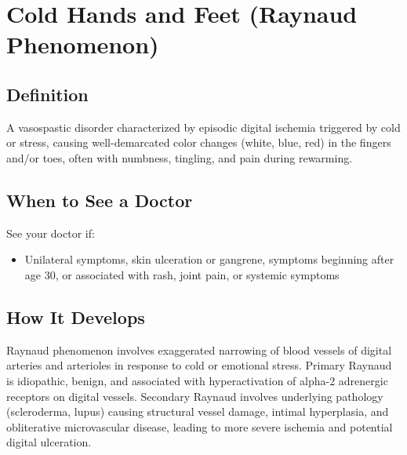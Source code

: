 \chapter{Cold Hands and Feet (Raynaud Phenomenon)}

\section*{Definition}
A vasospastic disorder characterized by episodic digital ischemia triggered by cold or stress, causing well-demarcated color changes (white, blue, red) in the fingers and/or toes, often with numbness, tingling, and pain during rewarming.

\section*{When to See a Doctor}
See your doctor if:
\begin{itemize}
  \item Unilateral symptoms, skin ulceration or gangrene, symptoms beginning after age 30, or associated with rash, joint pain, or systemic symptoms
\end{itemize}

\section*{How It Develops}
Raynaud phenomenon involves exaggerated narrowing of blood vessels of digital arteries and arterioles in response to cold or emotional stress. Primary Raynaud is idiopathic, benign, and associated with hyperactivation of alpha-2 adrenergic receptors on digital vessels. Secondary Raynaud involves underlying pathology (scleroderma, lupus) causing structural vessel damage, intimal hyperplasia, and obliterative microvascular disease, leading to more severe ischemia and potential digital ulceration.

